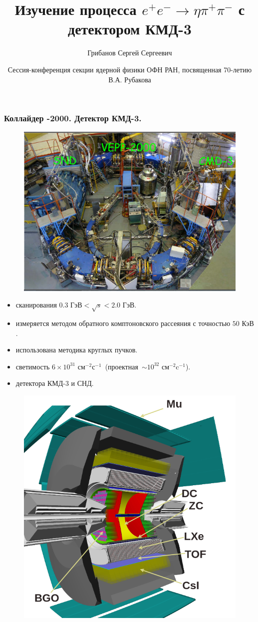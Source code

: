 \documentclass{beamer}
\title[$e^+e^-\rightarrow\eta\pi^+\pi^-$]{Изучение процесса $e^+e^-\to\eta\pi^+\pi^-$ с детектором КМД-3}
\author{Грибанов Сергей Сергеевич}
\institute{ИЯФ СО РАН}
\date[февраль, 2025]{Сессия-конференция секции ядерной физики ОФН РАН, посвященная 70-летию В.А. Рубакова}
\begin{document}
\frame{\titlepage}

\begin{frame}
  \frametitle{Коллайдер -2000. Детектор КМД-3.}
  \begin{minipage}[t]{0.59\linewidth}
    \begin{figure}
      \includegraphics[width=0.6\linewidth]{figures/vepp2k.png}
    \end{figure}
    \begin{itemize}
    \item{ сканирования $0.3\text{ ГэВ} < \sqrt{s} < 2.0\text{ ГэВ}$.}
    \item{ измеряется методом обратного комптоновского рассеяния с точностью
        $50\text{ КэВ}$.}
    \item{ использована методика круглых пучков.}
    \item{ светимость
        $6\times{10^{31}}\text{ см}^{-2}\text{с}^{-1}$~(проектная~$\sim{10^{32}}\text{ см}^{-2}\text{c}^{-1}$).}
    \item{ детектора КМД-3 и СНД.}
    \end{itemize}
  \end{minipage}
  \begin{minipage}[t]{0.4\linewidth}
    \begin{figure}
      \includegraphics[width=0.8\linewidth]{figures/cmd3.png}
    \end{figure}
  \end{minipage}
\end{frame}
\end{document}
